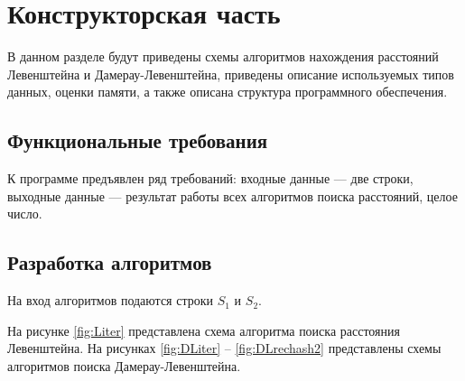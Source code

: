 \chapter{Конструкторская часть}

В данном разделе будут приведены схемы алгоритмов нахождения расстояний Левенштейна и Дамерау-Левенштейна, приведены описание используемых типов данных, оценки памяти, а также описана структура программного обеспечения.

\section {Функциональные требования}

К программе предъявлен ряд требований: входные данные --- две строки, выходные данные --- результат работы всех алгоритмов поиска расстояний, целое число.

\section{Разработка алгоритмов}

На вход алгоритмов подаются строки $S_1$ и $S_2$.

На рисунке \ref{fig:Liter} представлена схема алгоритма поиска расстояния Левенштейна.
На рисунках \ref{fig:DLiter} -- \ref{fig:DLrechash2} представлены схемы алгоритмов поиска Дамерау-Левенштейна.

